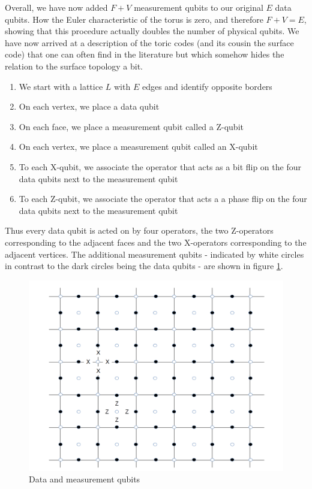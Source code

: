 \documentclass[a4paper, draft]{article}
\theoremstyle{own}
\theoremstyle{remark}
\begin{document}
Overall, we have now added $F + V$ measurement qubits to our original $E$ data qubits. How the Euler characteristic of the torus is zero, and therefore $F + V = E$, showing that this procedure actually doubles the number of physical qubits. We have now arrived at a description of the toric codes (and its cousin the surface code) that one can often find in the literature but which somehow hides the relation to the surface topology a bit.
\begin{enumerate}
	\item We start with a lattice $L$ with $E$ edges and identify opposite borders
	\item On each vertex, we place a data qubit
	\item On each face, we place a measurement qubit called a Z-qubit
	\item On each vertex, we place a measurement qubit called an X-qubit
	\item To each X-qubit, we associate the operator that acts as a bit flip on the four data qubits next to the measurement qubit
	\item To each Z-qubit, we associate the operator that acts a a phase flip on the four data qubits  next to the measurement qubit
\end{enumerate}

Thus every data qubit is acted on by four operators, the two Z-operators corresponding to the adjacent faces and the two X-operators corresponding to the adjacent vertices. The additional measurement qubits - indicated by white circles in contrast to the dark circles being the data qubits - are shown in figure \ref{fig:ToricCodeMeasurementQubits}.

\begin{figure}[ht]
\centering
\includegraphics[width=0.7\linewidth]{images/ToricCodeMeasurementQubits}
\caption[Data and measurement qubits]{Data and measurement qubits}
\label{fig:ToricCodeMeasurementQubits}
\end{figure}
\end{document}
